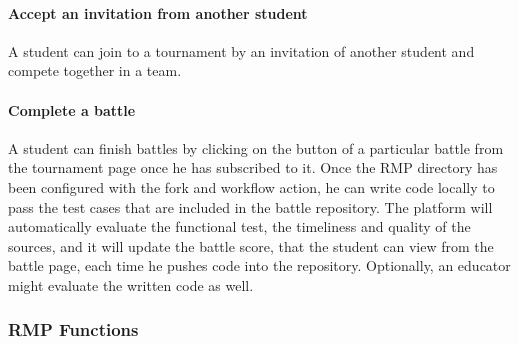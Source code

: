 \paragraph{Accept an invitation from another student}
A student can join to a tournament by an invitation of another student and compete together in a team.

\paragraph{Complete a battle}
A student can finish battles by clicking on the button of a particular battle from the tournament page once he has subscribed to it. Once the RMP directory has been configured with the fork and workflow action, he can write code 
locally to pass the test cases that are included in the battle repository. The platform will automatically evaluate the functional test, the timeliness and quality of the sources, and it will update the battle score, that the student 
can view from the battle page, each time he pushes code into the repository. Optionally, an educator might evaluate the written code as well.

\subsubsection{RMP Functions}
